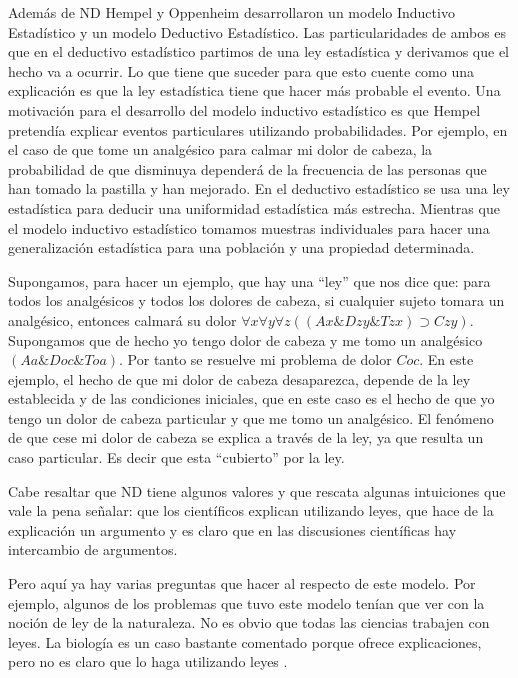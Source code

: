 Además de ND Hempel y Oppenheim desarrollaron un modelo Inductivo Estadístico y un modelo Deductivo Estadístico. Las particularidades de ambos es que en el deductivo estadístico partimos de una ley estadística y derivamos que el hecho va a ocurrir. Lo que tiene que suceder para que esto cuente como una explicación es que la ley estadística tiene que hacer más probable el evento. Una motivación para el desarrollo del modelo inductivo estadístico es que Hempel pretendía explicar eventos particulares utilizando probabilidades. Por ejemplo, en el caso de que tome un analgésico para calmar mi dolor de cabeza, la probabilidad de que disminuya dependerá de la frecuencia de las personas que han tomado la pastilla y han mejorado. En el deductivo estadístico se usa una ley estadística para deducir una uniformidad estadística más estrecha. Mientras que el modelo inductivo estadístico tomamos muestras individuales para hacer una generalización estadística para una población y una propiedad determinada.

Supongamos, para hacer un ejemplo, que hay una ``ley'' que nos dice que: para todos los analgésicos y todos los dolores de cabeza, si cualquier sujeto tomara un analgésico, entonces calmará su dolor $\forall{x}\forall{y}\forall{z}((Ax\&Dzy\&Tzx)\supset Czy)$. Supongamos que de hecho yo tengo dolor de cabeza y me tomo un analgésico $(Aa \& Doc \& Toa)$. Por tanto se resuelve mi problema de dolor $Coc$. En este ejemplo, el hecho de que mi dolor de cabeza desaparezca, depende de la ley establecida y de las condiciones iniciales, que en este caso es el hecho de que yo tengo un dolor de cabeza particular y que me tomo un analgésico. El fenómeno de que cese mi dolor de cabeza se explica a través de la ley, ya que resulta un caso particular. Es decir que esta ``cubierto'' por la ley.

Cabe resaltar que ND tiene algunos valores y que rescata algunas intuiciones que vale la pena señalar: que los científicos explican utilizando leyes, que hace de la explicación un argumento y es claro que en las discusiones científicas hay intercambio de argumentos.

Pero aquí ya hay varias preguntas que hacer al respecto de este modelo. Por ejemplo, algunos de los problemas que tuvo este modelo tenían que ver con la noción de ley de la naturaleza. No es obvio que todas las ciencias trabajen con leyes. La biología es un caso bastante comentado porque ofrece explicaciones, pero no es claro que lo haga utilizando leyes \cite{Brandon1997}.

